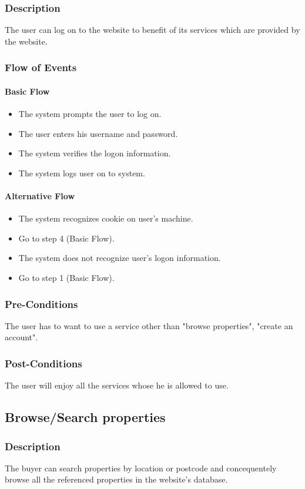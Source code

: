 \documentclass[a4paper,12pt]{article}
\begin{document}
\subsubsection{Description}
The user can log on to the website to benefit of its services which are provided by the website.
\subsubsection{Flow of Events}
\paragraph{Basic Flow}
\begin{itemize}
\item The system prompts the user to log on.
\item The user enters his username and password. 
\item The system verifies the logon information. 
\item The system logs user on to system.
\end{itemize}
\paragraph{Alternative Flow}
\begin{itemize}
\item The system recognizes cookie on user's machine. 
\item Go to step 4 (Basic Flow).
\item The system does not recognize user's logon information.
\item Go to step 1 (Basic Flow).
\end{itemize}
\subsubsection{Pre-Conditions}
The user has to want to use a service other than "browse properties", "create an account".
\subsubsection{Post-Conditions}
The user will enjoy all the services whose he is allowed to use.

\subsection{Browse/Search properties}
\subsubsection{Description}
The buyer can search properties by location or postcode and concequentely browse all the referenced properties in the website's database.
\end{document}
